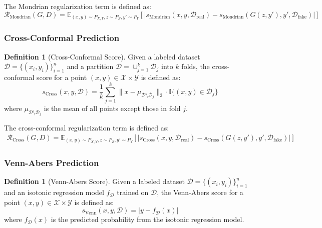 \documentclass{article}
\theoremstyle{plain}
\theoremstyle{definition}
\newtheorem{definition}[theorem]{Definition}
\theoremstyle{remark}
\begin{document}
The Mondrian regularization term is defined as:
\begin{equation}
\mathcal{R}_{\text{Mondrian}}(G, D) = \mathbb{E}_{(x,y) \sim P_{X,Y}, z \sim P_Z, y' \sim P_Y}\left[|s_{\text{Mondrian}}(x, y, \mathcal{D}_{\text{real}}) - s_{\text{Mondrian}}(G(z, y'), y', \mathcal{D}_{\text{fake}})|\right]
\end{equation}

\subsubsection{Cross-Conformal Prediction}

\begin{definition}[Cross-Conformal Score]
Given a labeled dataset $\mathcal{D} = \{(x_i, y_i)\}_{i=1}^n$ and a partition $\mathcal{D} = \cup_{j=1}^k \mathcal{D}_j$ into $k$ folds, the cross-conformal score for a point $(x, y) \in \mathcal{X} \times \mathcal{Y}$ is defined as:
\begin{equation}
s_{\text{Cross}}(x, y, \mathcal{D}) = \frac{1}{k}\sum_{j=1}^k \|x - \mu_{\mathcal{D} \setminus \mathcal{D}_j}\|_2 \cdot \mathbb{I}\{(x, y) \in \mathcal{D}_j\}
\end{equation}
where $\mu_{\mathcal{D} \setminus \mathcal{D}_j}$ is the mean of all points except those in fold $j$.
\end{definition}

The cross-conformal regularization term is defined as:
\begin{align}
\mathcal{R}_{\text{Cross}}(G, D) = \mathbb{E}_{(x,y) \sim P_{X,Y}, z \sim P_Z, y' \sim P_Y}\left[|s_{\text{Cross}}(x, y, \mathcal{D}_{\text{real}}) - s_{\text{Cross}}(G(z, y'), y', \mathcal{D}_{\text{fake}})|\right]
\end{align}

\subsubsection{Venn-Abers Prediction}

\begin{definition}[Venn-Abers Score]
Given a labeled dataset $\mathcal{D} = \{(x_i, y_i)\}_{i=1}^n$ and an isotonic regression model $f_{\mathcal{D}}$ trained on $\mathcal{D}$, the Venn-Abers score for a point $(x, y) \in \mathcal{X} \times \mathcal{Y}$ is defined as:
\begin{equation}
s_{\text{Venn}}(x, y, \mathcal{D}) = |y - f_{\mathcal{D}}(x)|
\end{equation}
where $f_{\mathcal{D}}(x)$ is the predicted probability from the isotonic regression model.
\end{definition}
\end{document}
